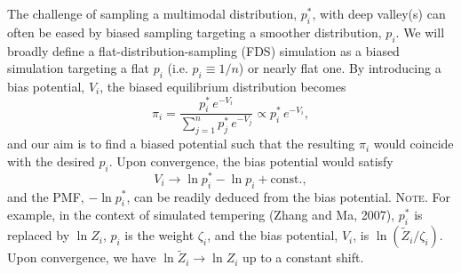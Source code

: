 \documentclass[reprint, superscriptaddress, floatfix]{revtex4-1}
\newcommand{\note}[1]{{\color{DarkGreen}\footnotesize \textsc{Note.} #1}}
\begin{document}
%
The challenge of sampling a multimodal distribution, $p^*_i$,
with deep valley(s) can often be eased by
biased sampling targeting a smoother distribution, $p_i$.
%
%
%
%
We will broadly define
a flat-distribution-sampling (FDS) simulation
as a biased simulation
targeting a flat $p_i$ (i.e. $p_i \equiv 1/n$)
or nearly flat one\cite{
dayal2004, *trebst2004, barducci2008, singh2011}.
%
By introducing a bias potential, $V_i$,
the biased equilibrium distribution becomes
%
\begin{equation}
  \pi_i
  =
  \frac{                p^*_i \, e^{-V_i} }
       { \sum_{j = 1}^n p^*_j \, e^{-V_j} }
  \propto
  p^*_i \, e^{-V_i}
  ,
  \label{eq:pi_p_V}
\end{equation}
%
and our aim is to find a biased potential
such that the resulting $\pi_i$ would coincide
with the desired $p_i$.
%
Upon convergence, the bias potential would satisfy
%
\begin{equation}
  V_i \to \ln p^*_i - \ln p_i + \mathrm{const.}
  ,
  \label{eq:Vi_target}
\end{equation}
%
%
and the PMF, $-\ln p^*_i$, can be readily 
deduced from the bias potential. %
\note{
  For example, in the context of simulated tempering (Zhang and Ma, 2007),
  $p^*_i$ is replaced by $\ln Z_i$,
  $p_i$ is the weight $\zeta_i$,
  and the bias potential, $V_i$, is $\ln (\tilde Z_i / \zeta_i)$.
  Upon convergence, we have $\ln \tilde Z_i \to \ln Z_i$
  up to a constant shift.
}
\end{document}
